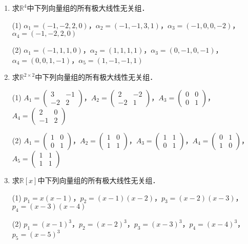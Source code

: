 \documentclass[a4paper,fontset=windows]{ctexbook}
\theoremstyle{definition}
\begin{document}
\begin{enumerate}
\item 求$\mathbb{R}^4$中下列向量组的所有极大线性无关组．

(1) $\alpha_1=(-1,-2,2,0)$，$\alpha_2=(-1,-1,3,1)$，$\alpha_3=(-1,0,0,-2)$，$\alpha_4=(-1,-2,2,0)$

(2) $\alpha_1=(-1,1,1,0)$，$\alpha_2=(1,1,1,1)$，$\alpha_3=(0,-1,0,-1)$，$\alpha_4=(0,0,1,-1)$，$\alpha_5=(1,-1,-1,1)$

\item 求$\mathbb{R}^{2\times 2}$中下列向量组的所有极大线性无关组．

(1) $A_1=\begin{pmatrix}3&-1 \\ -2&2\end{pmatrix}$，$A_2=\begin{pmatrix}2&-2 \\ -2&1\end{pmatrix}$，$A_3=\begin{pmatrix}0&0 \\ 0&1\end{pmatrix}$，$A_4=\begin{pmatrix}2&0 \\ -1&2\end{pmatrix}$

(2) $A_1=\begin{pmatrix}1&0 \\ 0&1\end{pmatrix}$，$A_2=\begin{pmatrix}1&0 \\ 1&1\end{pmatrix}$，$A_3=\begin{pmatrix}1&1 \\ 0&1\end{pmatrix}$，$A_4=\begin{pmatrix}0&1 \\ 1&0\end{pmatrix}$，$A_5=\begin{pmatrix}1&1 \\ 1&1\end{pmatrix}$

\item 求$\mathbb{R}[x]$中下列向量组的所有极大线性无关组．

(1) $p_1=x(x-1)$，$p_2=(x-1)(x-2)$，$p_3=(x-2)(x-3)$，$p_4=(x-3)(x-4)$

(2) $p_1=(x-1)^3$，$p_2=(x-2)^3$，$p_3=(x-3)^3$，$p_4=(x-4)^3$，$p_5=(x-5)^3$


\end{enumerate}
\end{document}
